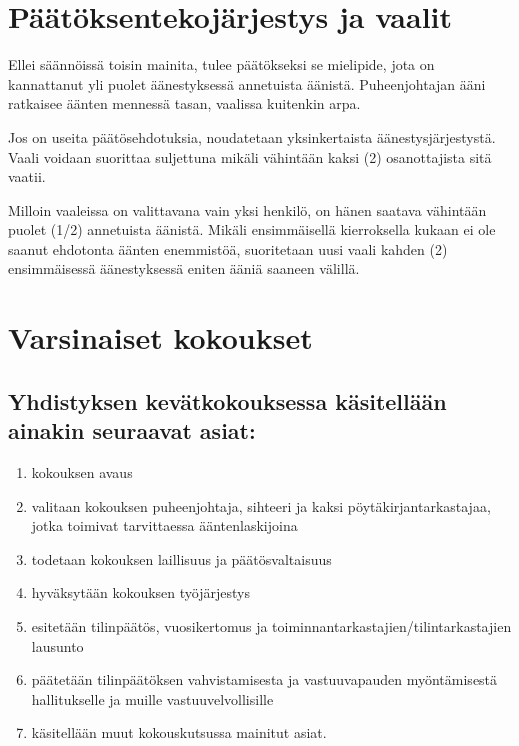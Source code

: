 \documentclass[a4paper, 12pt, finnish]{scrartcl}
\begin{document}
\section{Päätöksentekojärjestys ja vaalit}
Ellei säännöissä toisin mainita, tulee päätökseksi se mielipide, jota on kannattanut yli puolet äänestyksessä annetuista äänistä.
Puheenjohtajan ääni ratkaisee äänten mennessä tasan, vaalissa kuitenkin arpa.

Jos on useita päätösehdotuksia, noudatetaan yksinkertaista äänestysjärjestystä.
Vaali voidaan suorittaa suljettuna mikäli vähintään kaksi (2) osanottajista sitä vaatii.

Milloin vaaleissa on valittavana vain yksi henkilö, on hänen saatava vähintään puolet (1/2) annetuista äänistä.
Mikäli ensimmäisellä kierroksella kukaan ei ole saanut ehdotonta äänten enemmistöä, suoritetaan uusi vaali kahden (2) ensimmäisessä äänestyksessä eniten ääniä saaneen välillä.

\section{Varsinaiset kokoukset}

\subsection*{Yhdistyksen kevätkokouksessa käsitellään ainakin seuraavat asiat:}
\begin{enumerate}
  \item kokouksen avaus
  \item valitaan kokouksen puheenjohtaja, sihteeri ja kaksi pöytäkirjantarkastajaa, jotka toimivat tarvittaessa ääntenlaskijoina
  \item todetaan kokouksen laillisuus ja päätösvaltaisuus
  \item hyväksytään kokouksen työjärjestys
  \item esitetään tilinpäätös, vuosikertomus ja toiminnantarkastajien/tilintarkastajien lausunto
  \item päätetään tilinpäätöksen vahvistamisesta ja vastuuvapauden myöntämisestä hallitukselle ja muille vastuuvelvollisille
  \item käsitellään muut kokouskutsussa mainitut asiat.
\end{enumerate}
\end{document}
